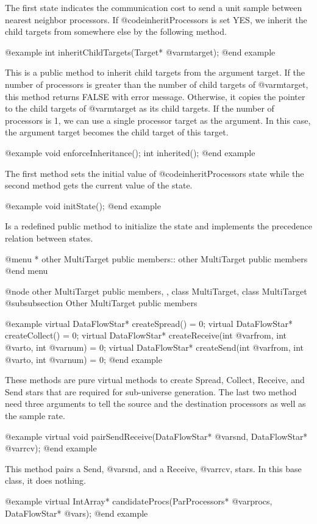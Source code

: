 The first state indicates the communication cost to send a unit sample
between nearest neighbor processors. If @code{inheritProcessors} is set YES,
we inherit the child targets from somewhere else by the following method.

@example
int inheritChildTargets(Target* @var{mtarget});
@end example

This is a public method to inherit child targets from the argument target.
If the number of processors is greater than the number of child targets
of @var{mtarget}, this method returns FALSE with error message. Otherwise,
it copies the pointer to the child targets of @var{mtarget} as its child
targets. If the number of processors is 1, we can use a single processor
target as the argument. In this case, the argument target becomes the child
target of this target.

@example
void enforceInheritance();
int inherited();
@end example

The first method sets the initial value of @code{inheritProcessors} state
while the second method gets the current value of the state.

@example
void initState();
@end example

Is a redefined public method to initialize the state and implements
the precedence relation between states.

@menu
* other MultiTarget public members::	other MultiTarget public members
@end menu

@node other MultiTarget public members, , class MultiTarget, class MultiTarget
@subsubsection Other MultiTarget public members

@example
virtual DataFlowStar* createSpread() = 0;
virtual DataFlowStar* createCollect() = 0;
virtual DataFlowStar* createReceive(int @var{from}, int @var{to}, int @var{num}) = 0;
virtual DataFlowStar* createSend(int @var{from}, int @var{to}, int @var{num}) = 0;
@end example

These methods are pure virtual methods to create Spread, Collect, Receive, and
Send stars that are required for sub-universe generation. The last two method
need three arguments to tell the source and the destination processors as well
as the sample rate.

@example
virtual void pairSendReceive(DataFlowStar* @var{snd}, DataFlowStar* @var{rcv});
@end example

This method pairs a Send, @var{snd}, and a Receive, @var{rcv}, stars. In this
base class, it does nothing.

@example
virtual IntArray* candidateProcs(ParProcessors* @var{procs}, DataFlowStar* @var{s});
@end example

